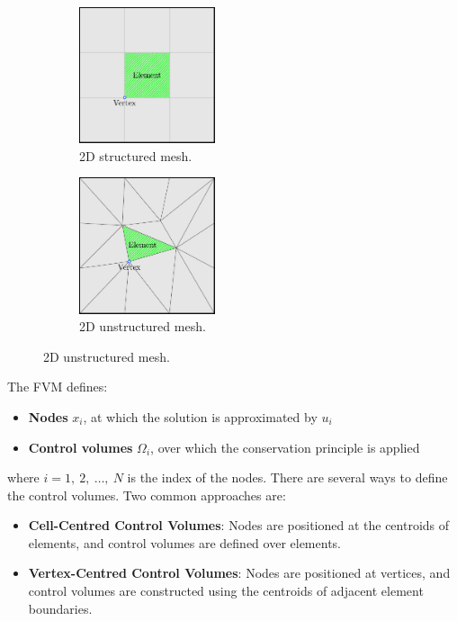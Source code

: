 \documentclass{article}
\begin{document}
\begin{figure}[H]
    \centering
    \begin{subfigure}[t]{0.45\textwidth}
        \centering
        \includegraphics[height = 4cm]{figures/2d-structured-mesh.pdf}
        \caption{2D structured mesh.} %
    \end{subfigure}
    \begin{subfigure}[t]{0.45\textwidth}
        \centering
        \includegraphics[height = 4cm]{figures/2d-unstructured-mesh.pdf}
        \caption{2D unstructured mesh.} %
    \end{subfigure}
\end{figure}
The FVM defines:
\begin{itemize}
    \item \textbf{Nodes} \(x_i\), at which the solution is
          approximated by \(u_i\)
    \item \textbf{Control volumes} \(\Omega_i\), over which the
          conservation principle is applied
\end{itemize}
where \(i = 1,\: 2,\: \ldots,\: N\) is the index of the nodes.
There are several ways to define the control volumes. Two common
approaches are:
\begin{itemize}
    \item \textbf{Cell-Centred Control Volumes}: Nodes are positioned
          at the centroids of elements, and control volumes are defined over
          elements.
    \item \textbf{Vertex-Centred Control Volumes}: Nodes are positioned
          at vertices, and control volumes are constructed using the centroids
          of adjacent element boundaries.
\end{itemize}
\end{document}
